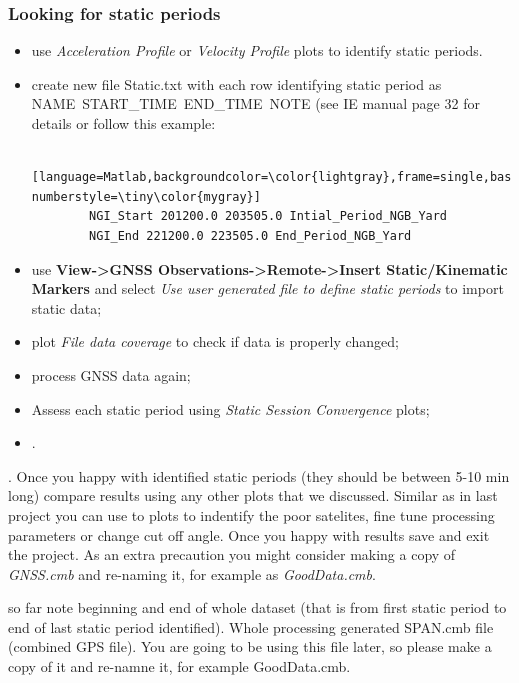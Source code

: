 \documentclass[british]{book}
\renewcommand{\footnotesize}{\scriptsize} %
\begin{document}
\subsubsection{Looking for static periods\label{sec:Static-periods}}

\begin{itemize}
\item use \emph{Acceleration Profile} or \emph{Velocity Profile} plots to identify static periods.
\item create new file Static.txt with each row identifying static period as NAME~START\_TIME~END\_TIME~NOTE (see IE manual page 32 for details or follow this example: 
	\begin{lstlisting} [language=Matlab,backgroundcolor=\color{lightgray},frame=single,basicstyle=\footnotesize,numbers=left,numbersep=5pt, numberstyle=\tiny\color{mygray}]
		NGI_Start 201200.0 203505.0 Intial_Period_NGB_Yard
		NGI_End 221200.0 223505.0 End_Period_NGB_Yard
	\end{lstlisting}
\item use \textbf{View->GNSS Observations->Remote->Insert Static/Kinematic Markers} and select \textit{Use user generated file to define static periods} to import static data;
\item plot \textit{File data coverage} to check if data is properly changed;
\item process GNSS data again;
\item Assess each static period using \emph{Static Session Convergence} plots; 
\item .
\end{itemize}

. Once you happy with identified static periods (they should be between 5-10 min long) compare results using any other plots that we discussed. Similar as in last project you can use to plots to indentify the poor satelites, fine tune processing parameters or change cut off angle. Once you happy with results save and exit the project. As an extra precaution you might consider making a copy of \textit{GNSS.cmb} and re-naming it, for example as \textit{GoodData.cmb}. 

 so far note beginning and end of whole dataset (that is from first static period to end of last static period identified). Whole processing  generated SPAN.cmb file (combined GPS file). You are going to be using this file later, so please make a copy of it and re-namne it, for example GoodData.cmb. 
\end{document}
